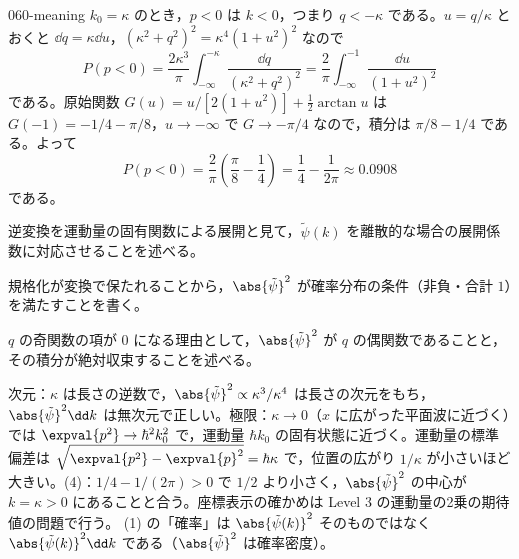 \documentclass[uplatex,dvipdfmx,a4paper,11pt]{jsarticle}
\begin{document}
\begin{kaisetsu}{060-meaning}
 $k_{0}=\kappa$ のとき，$p<0$ は $k<0$，つまり $q<-\kappa$ である。$u=q/\kappa$ とおくと $\dd q=\kappa\dd u$，$(\kappa^{2}+q^{2})^{2}=\kappa^{4}(1+u^{2})^{2}$ なので
\[ P(p<0)=\frac{2\kappa^{3}}{\pi}\int_{-\infty}^{-\kappa}\frac{\dd q}{(\kappa^{2}+q^{2})^{2}}=\frac{2}{\pi}\int_{-\infty}^{-1}\frac{\dd u}{(1+u^{2})^{2}} \]
である。原始関数 $G(u)=u/[2(1+u^{2})]+\frac{1}{2}\arctan u$ は $G(-1)=-1/4-\pi/8$，$u\to-\infty$ で $G\to-\pi/4$ なので，積分は $\pi/8-1/4$ である。よって
\[ P(p<0)=\frac{2}{\pi}\left(\frac{\pi}{8}-\frac{1}{4}\right)=\frac{1}{4}-\frac{1}{2\pi}\approx0.0908 \]
である。
\begin{ronten}
  \item {} 逆変換を運動量の固有関数による展開と見て，$\tilde{\psi}(k)$ を離散的な場合の展開係数に対応させることを述べる。
  \item {} 規格化が変換で保たれることから，$\abs{\tilde{\psi}}^{2}$ が確率分布の条件（非負・合計 $1$）を満たすことを書く。
  \item {} $q$ の奇関数の項が $0$ になる理由として，$\abs{\tilde{\psi}}^{2}$ が $q$ の偶関数であることと，その積分が絶対収束することを述べる。
\end{ronten}
\kenzan 次元：$\kappa$ は長さの逆数で，$\abs{\tilde{\psi}}^{2}\propto\kappa^{3}/\kappa^{4}$ は長さの次元をもち，$\abs{\tilde{\psi}}^{2}\dd k$ は無次元で正しい。極限：$\kappa\to0$（$x$ に広がった平面波に近づく）では $\expval{p^{2}}\to\hbar^{2}k_{0}^{2}$ で，運動量 $\hbar k_{0}$ の固有状態に近づく。運動量の標準偏差は $\sqrt{\expval{p^{2}}-\expval{p}^{2}}=\hbar\kappa$ で，位置の広がり $1/\kappa$ が小さいほど大きい。(4)：$1/4-1/(2\pi)>0$ で $1/2$ より小さく，$\abs{\tilde{\psi}}^{2}$ の中心が $k=\kappa>0$ にあることと合う。座標表示の確かめは Level 3 の運動量の2乗の期待値の問題で行う。
\tsumazuki (1) の「確率」は $\abs{\tilde{\psi}(k)}^{2}$ そのものではなく $\abs{\tilde{\psi}(k)}^{2}\dd k$ である（$\abs{\tilde{\psi}}^{2}$ は確率密度）。
\end{kaisetsu}
\end{document}

